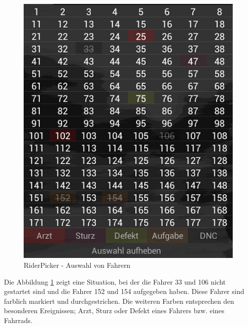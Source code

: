 \begin{figure}[h!]
\caption{RiderPicker - Auswahl von Fahrern}
\label{fig:riderpicker}
\centering
\includegraphics[scale=0.5]{05bericht/images/riderpicker.png}
\end{figure}

Die Abbildung \ref{fig:riderpicker} zeigt eine Situation, bei der die Fahrer 33 und 106 nicht gestartet sind und die Fahrer 152 und 154 aufgegeben haben. Diese Fahrer sind farblich markiert und durchgestrichen. Die weiteren Farben entsprechen den besonderen Ereignissen; Arzt, Sturz oder Defekt eines Fahrers bzw. eines Fahrrads.
